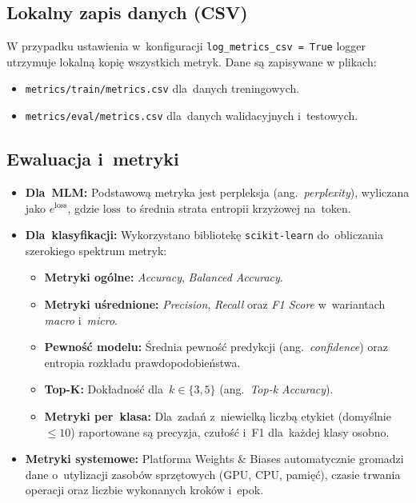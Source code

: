 \documentclass[a4paper,11pt,twoside]{report}
\theoremstyle{definition}
\begin{document}
\subsection{Lokalny zapis danych (CSV)}
W przypadku ustawienia w~konfiguracji \texttt{log\_metrics\_csv = True} logger utrzymuje lokalną kopię wszystkich metryk. Dane są zapisywane w plikach:
\begin{itemize}
    \item \texttt{metrics/train/metrics.csv} dla~danych treningowych.
    \item \texttt{metrics/eval/metrics.csv} dla~danych walidacyjnych i~testowych.
\end{itemize}

\subsection{Ewaluacja i~metryki}
\begin{itemize}
    \item \textbf{Dla~MLM:} Podstawową metryka jest perpleksja (ang.\ \emph{perplexity}), wyliczana jako $e^{\text{loss}}$, gdzie $\text{loss}$~to średnia strata entropii krzyżowej na~token.
    \item \textbf{Dla~klasyfikacji:} Wykorzystano bibliotekę \texttt{scikit-learn} do~obliczania szerokiego spektrum metryk:
    \begin{itemize}
        \item \textbf{Metryki ogólne:} \textit{Accuracy}, \textit{Balanced Accuracy}.
        \item \textbf{Metryki uśrednione:} \textit{Precision}, \textit{Recall} oraz \textit{F1 Score} w~wariantach \textit{macro} i~\textit{micro}.
        \item \textbf{Pewność modelu:} Średnia pewność predykcji (ang.\ \emph{confidence}) oraz entropia rozkładu prawdopodobieństwa.
        \item \textbf{Top-K:} Dokładność dla~$k \in \{3, 5\}$ (ang.\ \emph{Top-k Accuracy}).
        \item \textbf{Metryki per~klasa:} Dla~zadań z~niewielką liczbą etykiet (domyślnie $\le 10$) raportowane są precyzja, czułość i~F1 dla~każdej klasy osobno.
    \end{itemize}
    \item \textbf{Metryki systemowe:} Platforma Weights \& Biases automatycznie gromadzi dane o~utylizacji zasobów sprzętowych (GPU, CPU, pamięć), czasie trwania operacji oraz liczbie wykonanych kroków i~epok.
\end{itemize}
\end{document}
